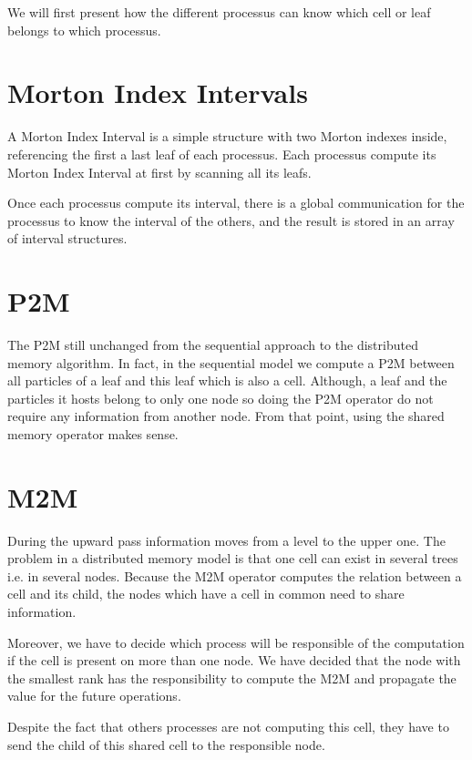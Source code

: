 \documentclass[12pt,letterpaper,titlepage]{report}
\begin{document}
We will first present how the different processus can know which cell
or leaf belongs to which processus.

\section{Morton Index Intervals}
A Morton Index Interval is a simple structure with two Morton indexes
inside, referencing the first a last leaf of each processus.  Each
processus compute its Morton Index Interval at first by scanning all
its leafs.

Once each processus compute its interval, there is a global
communication for the processus to know the interval of the others,
and the result is stored in an array of interval structures.


\section{P2M}
The P2M still unchanged from the sequential approach to the
distributed memory algorithm.  In fact, in the sequential model we
compute a P2M between all particles of a leaf and this leaf which is
also a cell.  Although, a leaf and the particles it hosts belong to
only one node so doing the P2M operator do not require any information
from another node.  From that point, using the shared memory operator
makes sense.

\clearpage
\section{M2M}
During the upward pass information moves from a level to the upper
one.  The problem in a distributed memory model is that one cell can
exist in several trees i.e. in several nodes.  Because the M2M
operator computes the relation between a cell and its child, the nodes
which have a cell in common need to share information.

Moreover, we have to decide which process will be responsible of the
computation if the cell is present on more than one node.  We have
decided that the node with the smallest rank has the responsibility to
compute the M2M and propagate the value for the future operations.

Despite the fact that others processes are not computing this cell,
they have to send the child of this shared cell to the responsible
node.
\end{document}
